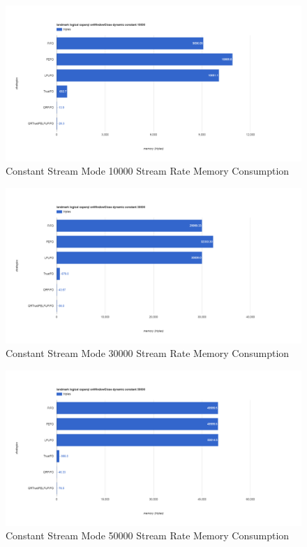 \begin{figure}[!htbp]
    \centering
    \includegraphics[width=\textwidth]{img/app3-c-10000-m.png}
    \caption{Constant Stream Mode 10000 Stream Rate Memory Consumption}
\end{figure}
\begin{figure}[!htbp]
    \centering
    \includegraphics[width=\textwidth]{img/app3-c-30000-m.png}
    \caption{Constant Stream Mode 30000 Stream Rate Memory Consumption}
\end{figure}
\begin{figure}[!htbp]
    \centering
    \includegraphics[width=\textwidth]{img/app3-c-50000-m.png}
    \caption{Constant Stream Mode 50000 Stream Rate Memory Consumption}
\end{figure}
